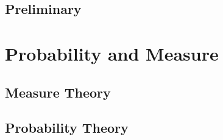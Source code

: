 \documentclass[graybox,envcountchap,envcountsame,sectrefs,fleqn]{svmono}
\begin{document}
\tableofcontents

\mainmatter%

\chapter{Preliminary}



\part{Probability and Measure}

\chapter{Measure Theory}



\chapter{Probability Theory}





% 

\backmatter%
\end{document}
